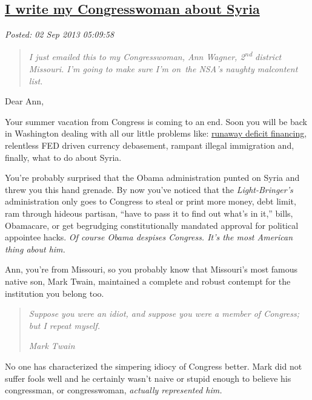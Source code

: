 %

\subsection*{\href{https://bakerjd99.wordpress.com/2013/09/02/i-write-my-congresswoman-about-syria/}{I write my Congresswoman about Syria}}


\noindent\emph{Posted: 02 Sep 2013 05:09:58}
\vspace{6pt}

\begin{quote}
\emph{I just emailed this to my Congresswoman, Ann Wagner,
2\textsuperscript{nd} district Missouri. I'm going to make sure I'm
on~the NSA's naughty malcontent list.}
\end{quote}

\noindent Dear Ann,

\medskip

Your summer vacation from Congress is coming to an end. Soon you will be
back in Washington dealing with all our little problems like:
\href{http://www.usdebtclock.org/}{runaway deficit financing},
relentless FED driven currency debasement, rampant illegal immigration
and, finally, what to do about Syria.

You're probably surprised that the Obama administration punted on Syria
and threw you this hand grenade. By now you've noticed that the
\emph{Light-Bringer's} administration only goes to Congress to steal or
print more money, debt limit, ram through hideous partisan, ``have to
pass it to find out what's in it,'' bills, Obamacare, or get begrudging
constitutionally mandated approval for political appointee hacks.
\emph{Of course Obama despises Congress. It's the most American thing
about him.}

Ann, you're from Missouri, so you probably know that Missouri's most
famous native son, Mark Twain, maintained a complete and robust contempt
for the institution you belong too.

\begin{quote}
\emph{Suppose you were an idiot, and suppose you were a member of Congress;
but I repeat myself.}

\emph{Mark Twain}
\end{quote}

No one has characterized the simpering idiocy of Congress better. Mark
did not suffer fools well and he certainly wasn't naive or stupid enough
to believe his congressman, or congresswoman, \emph{actually represented
him.}

